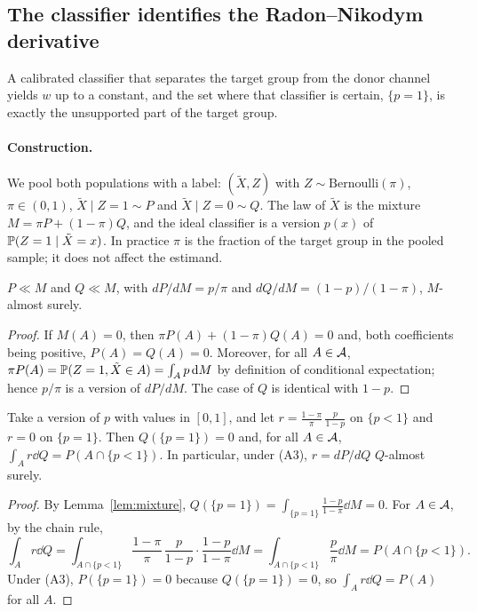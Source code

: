\subsection{The classifier identifies the Radon--Nikodym derivative}\label{sec:classifier}

A calibrated classifier that separates the target group from the donor channel yields $w$ up to a constant, and the set where that classifier is certain, $\{p=1\}$, is exactly the unsupported part of the target group.

\paragraph{Construction.} We pool both populations with a label: $(\tilde X,Z)$ with $Z\sim\mathrm{Bernoulli}(\pi)$, $\pi\in(0,1)$, $\tilde X\mid Z=1\sim P$ and $\tilde X\mid Z=0\sim Q$. The law of $\tilde X$ is the mixture $M=\pi P+(1-\pi)Q$, and the ideal classifier is a version $p(x)$ of $\mathbb{P}(Z=1\mid\tilde X=x)$. In practice $\pi$ is the fraction of the target group in the pooled sample; it does not affect the estimand.

\begin{lemma}\label{lem:mixture}
$P\ll M$ and $Q\ll M$, with $dP/dM=p/\pi$ and $dQ/dM=(1-p)/(1-\pi)$, $M$-almost surely.
\end{lemma}
\begin{proof}
If $M(A)=0$, then $\pi P(A)+(1-\pi)Q(A)=0$ and, both coefficients being positive, $P(A)=Q(A)=0$. Moreover, for all $A\in\mathcal{A}$, $\pi P(A)=\mathbb{P}(Z=1,\tilde X\in A)=\int_A p\,\mathrm{d} M$ by definition of conditional expectation; hence $p/\pi$ is a version of $dP/dM$. The case of $Q$ is identical with $1-p$.
\end{proof}

\begin{theorem}\label{thm:odds}
Take a version of $p$ with values in $[0,1]$, and let $r=\frac{1-\pi}{\pi}\,\frac{p}{1-p}$ on $\{p<1\}$ and $r=0$ on $\{p=1\}$. Then $Q(\{p=1\})=0$ and, for all $A\in\mathcal{A}$, $\int_A r\dd Q=P(A\cap\{p<1\})$. In particular, under (A3), $r=dP/dQ$ $Q$-almost surely.
\end{theorem}
\begin{proof}
By Lemma~\ref{lem:mixture}, $Q(\{p=1\})=\int_{\{p=1\}}\frac{1-p}{1-\pi}\dd M=0$. For $A\in\mathcal{A}$, by the chain rule,
\[
\int_A r\dd Q=\int_{A\cap\{p<1\}}\frac{1-\pi}{\pi}\,\frac{p}{1-p}\cdot\frac{1-p}{1-\pi}\dd M=\int_{A\cap\{p<1\}}\frac{p}{\pi}\dd M=P(A\cap\{p<1\}).
\]
Under (A3), $P(\{p=1\})=0$ because $Q(\{p=1\})=0$, so $\int_A r\dd Q=P(A)$ for all $A$.
\end{proof}

